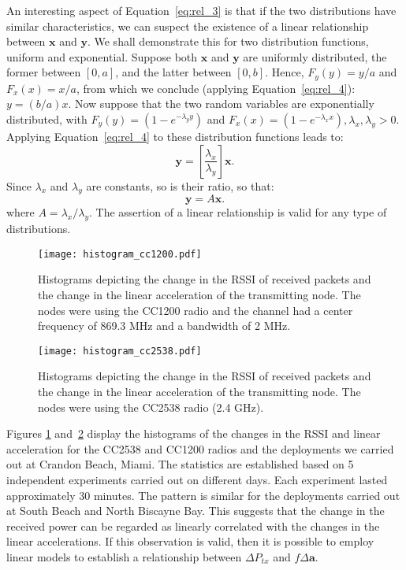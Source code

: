 An interesting aspect of Equation~\ref{eq:rel_3} is that if the two distributions have similar characteristics, we can suspect the existence of a linear relationship between $\mathbf{x}$ and $\mathbf{y}$. We shall demonstrate this for two distribution functions, uniform and exponential. Suppose both $\mathbf{x}$ and $\mathbf{y}$ are uniformly distributed, the former between $[0, a]$, and the latter between $[0,b]$. Hence, $F_y(y) = y/a$ and $F_x(x) = x/a$, from which we conclude (applying Equation~\ref{eq:rel_4}): $y = (b/a) x$. Now suppose that the two random variables are exponentially distributed, with $F_y(y) = ( 1 -  e^{-\lambda_y y})$ and   $F_x(x) = (1 - e^{-\lambda_x x}), \lambda_x, \lambda_y > 0$.  Applying Equation~\ref{eq:rel_4} to these distribution functions leads to:
\[
\mathbf{y} = \left [ \frac{\lambda_x}{\lambda_y} \right ]  \mathbf{x}.
\]
 Since $\lambda_x$ and  $\lambda_y$ are constants, so is their ratio, so that: 
\[
\mathbf{y} = A \mathbf{x}.
\]
where $A = \lambda_x/\lambda_y$. The assertion of a linear relationship is valid for any type of distributions.

\begin{figure}
	\centering
	\texttt{[image: histogram\_cc1200.pdf]}
	\caption{Histograms depicting the change in the RSSI of received packets and the change in the linear acceleration of the transmitting node. The nodes were using the CC1200 radio and the channel had a center frequency of 869.3 MHz and a bandwidth of 2 MHz.}
	\label{fig:histogram_cc1200}
\end{figure}

\begin{figure}
	\centering
	\texttt{[image: histogram\_cc2538.pdf]}
	\caption{Histograms depicting the change in the RSSI of received packets and the change in the linear acceleration of the transmitting node. The nodes were using the CC2538 radio (2.4 GHz).}
	\label{fig:histogram_cc2538}
\end{figure}

Figures \ref{fig:histogram_cc1200} and~\ref{fig:histogram_cc2538} display the histograms of the changes in the RSSI and linear acceleration for the CC2538 and CC1200 radios and the deployments we carried out at Crandon Beach, Miami. The statistics are established based on 5 independent experiments carried out on different days. Each experiment lasted approximately 30 minutes. The pattern is similar for the deployments carried out at South Beach and North Biscayne Bay. This suggests that the change in the received power can be regarded as linearly correlated with the changes in the linear accelerations. If this observation is valid, then it is possible to employ linear models to establish a relationship between $\Delta P_{tx}$ and $f\Delta \mathbf{a}$.


